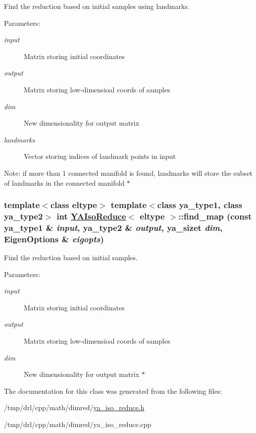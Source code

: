 Find the reduction based on initial samples using landmarks. 

\begin{Desc}
\item[Parameters:]
\begin{description}
\item[{\em input}]Matrix storing initial coordinates \item[{\em output}]Matrix storing low-dimensioal coords of samples \item[{\em dim}]New dimensionality for output matrix \item[{\em landmarks}]Vector storing indices of landmark points in input \end{description}
\end{Desc}
\begin{Desc}
\item[Note:]if more than 1 connected manifold is found, landmarks will store the subset of landmarks in the connected manifold $\ast$ \end{Desc}
\hypertarget{class_y_a_iso_reduce_a5}{
\subsubsection[find\_\-map]{\setlength{\rightskip}{0pt plus 5cm}template$<$class eltype$>$ template$<$class ya\_\-type1, class ya\_\-type2$>$ int \hyperlink{class_y_a_iso_reduce}{YAIso\-Reduce}$<$ eltype $>$::find\_\-map (const ya\_\-type1 \& {\em input}, ya\_\-type2 \& {\em output}, ya\_\-sizet {\em dim}, Eigen\-Options \& {\em eigopts})}}
\label{class_y_a_iso_reduce_a5}


Find the reduction based on initial samples. 

\begin{Desc}
\item[Parameters:]
\begin{description}
\item[{\em input}]Matrix storing initial coordinates \item[{\em output}]Matrix storing low-dimensioal coords of samples \item[{\em dim}]New dimensionality for output matrix $\ast$ \end{description}
\end{Desc}


The documentation for this class was generated from the following files:\begin{CompactItemize}
\item 
/tmp/drl/cpp/math/dimred/\hyperlink{ya__iso__reduce_8h}{ya\_\-iso\_\-reduce.h}\item 
/tmp/drl/cpp/math/dimred/ya\_\-iso\_\-reduce.cpp\end{CompactItemize}
